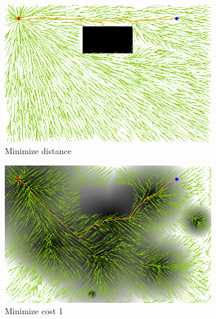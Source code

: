 \documentclass{article}
\begin{document}
\begin{figure}
	\centering
	\begin{subfigure}[b]{0.45\linewidth}
		\centering
		\includegraphics[width=\textwidth]{fig/sim4-obstacle/MORRTstar01-1-0.png}
		\caption{Minimize distance}
		\label{fig:sim:obs:distance}
	\end{subfigure}
	\begin{subfigure}[b]{0.45\linewidth}
		\centering
		\includegraphics[width=\textwidth]{fig/sim4-obstacle/MORRTstar01-1-1.png}
		\caption{Minimize cost 1}
		\label{fig:sim:obs:fitness1}
	\end{subfigure}  \\
	\begin{subfigure}[b]{0.45\linewidth}
		\centering

\end{subfigure}
\end{figure}
\end{document}
